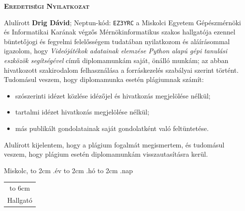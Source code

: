 \endgroup

\newpage

\vspace*{1cm}
\begin{center}
\large\textsc{\bfseries Eredetiségi Nyilatkozat}
\end{center}
\vspace*{2cm}

Alulírott \textbf{Drig Dávid}; Neptun-kód: \texttt{EZ3YRC} a Miskolci Egyetem Gépészmérnöki és Informatikai Karának végzős Mérnökinformatikus szakos hallgatója ezennel büntetőjogi és fegyelmi felelősségem tudatában nyilatkozom és aláírásommal igazolom, hogy \textit{Videójátékok adatainak elemzése Python alapú gépi tanulási eszközök segítségével}
című diplomamunkám saját, önálló munkám; az abban hivatkozott szakirodalom
felhasználása a forráskezelés szabályai szerint történt.\\

Tudomásul veszem, hogy diplomamunka esetén plágiumnak számít:
\begin{itemize}
\item szószerinti idézet közlése idézőjel és hivatkozás megjelölése nélkül;
\item tartalmi idézet hivatkozás megjelölése nélkül;
\item más publikált gondolatainak saját gondolatként való feltüntetése.
\end{itemize}

Alulírott kijelentem, hogy a plágium fogalmát megismertem, és tudomásul veszem, hogy
plágium esetén diplomamunkám visszautasításra kerül.

\vspace*{3cm}

\noindent Miskolc, \hbox to 2cm{\dotfill} .év \hbox to 2cm{\dotfill} .hó \hbox to 2cm{\dotfill} .nap

\vspace*{3cm}

\hspace*{8cm}\begin{tabular}{c}
\hbox to 6cm{\dotfill}\\
Hallgató
\end{tabular}